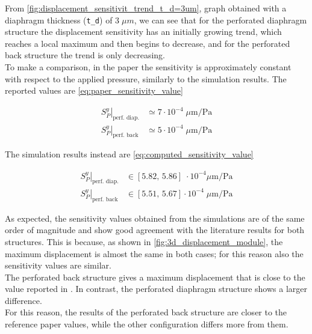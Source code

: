 \newpage
\noindent
From \autoref{fig:displacement_sensitivit_trend_t_d=3um}, graph obtained with a diaphragm thickness (\texttt{t\_d}) of \(3 \; \mu m\), we can see that for the perforated diaphragm structure the displacement sensitivity has an initially growing trend, which reaches a local maximum and then begins to decrease, and for the perforated back structure the trend is only decreasing. \\
To make a comparison, in the paper \cite{krishnapriya2014} the sensitivity is approximately constant with respect to the applied pressure, similarly to the simulation results. The reported values are \cref{eq:paper_sensitivity_value}

\begin{equation}
    \begin{aligned}
        \left. S_P^y \right|_{\text{perf. diap.}} &\simeq 7 \cdot 10^{-4} \; \mu\text{m}/\text{Pa} \\
        \left. S_P^y \right|_{\text{perf. back}} &\simeq 5 \cdot 10^{-4} \; \mu\text{m}/\text{Pa}
    \end{aligned}
    \label{eq:paper_sensitivity_value}
\end{equation}

The simulation results instead are \cref{eq:computed_sensitivity_value}

\begin{equation}
    \begin{aligned}
        \left. S_P^y \right|_{\text{perf. diap.}} &\in \left[5.82 ,\, 5.86\right]  \; \cdot 10^{-4} \mu\text{m}/\text{Pa} \\
        \left. S_P^y \right|_{\text{perf. back}} &\in \left[5.51 ,\, 5.67\right] \cdot 10^{-4} \; \mu\text{m}/\text{Pa}
    \end{aligned}
    \label{eq:computed_sensitivity_value}
\end{equation}

\noindent
As expected, the sensitivity values obtained from the simulations are of the same order of magnitude and show good agreement with the literature results for both structures.
This is because, as shown in \autoref{fig:3d_displacement_module}, the maximum displacement is almost the same in both cases; for this reason also the sensitivity values are similar. \\ 
The perforated back structure gives a maximum displacement that is close to the value reported in \cite{krishnapriya2014}. In contrast, the perforated diaphragm structure shows a larger difference. \\
For this reason, the results of the perforated back structure are closer to the reference paper values, while the other configuration differs more from them.

\newpage
